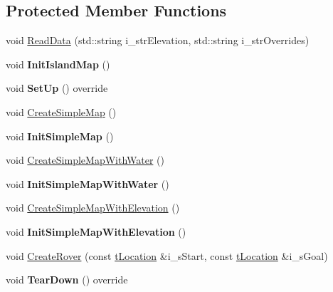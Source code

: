 \subsection*{Protected Member Functions}
\begin{DoxyCompactItemize}
\item 
void \mbox{\hyperlink{classc_planner_test_af8a0f625c6cb4dffc1ea3182332e53c6}{Read\+Data}} (std\+::string i\+\_\+str\+Elevation, std\+::string i\+\_\+str\+Overrides)
\item 
\mbox{\label{classc_planner_test_ac1aac6152ea3ac86c5205fd8f0835d0c}} 
void {\bfseries Init\+Island\+Map} ()
\item 
\mbox{\label{classc_planner_test_a88ad8b0e63c66a9d94c7606aa67ef20d}} 
void {\bfseries Set\+Up} () override
\item 
void \mbox{\hyperlink{classc_planner_test_a448aac45bdd26a18050613619d9f33e4}{Create\+Simple\+Map}} ()
\item 
\mbox{\label{classc_planner_test_a35a934fb8c86a7c661c94ffeb4dd7a52}} 
void {\bfseries Init\+Simple\+Map} ()
\item 
void \mbox{\hyperlink{classc_planner_test_a1e8b184185494cae8444fb7d5f846334}{Create\+Simple\+Map\+With\+Water}} ()
\item 
\mbox{\label{classc_planner_test_aa55c78961deacf34543933e12cd82000}} 
void {\bfseries Init\+Simple\+Map\+With\+Water} ()
\item 
void \mbox{\hyperlink{classc_planner_test_a3d08d274ae12fbecd664ec70b4d6dfa3}{Create\+Simple\+Map\+With\+Elevation}} ()
\item 
\mbox{\label{classc_planner_test_a59339eef13103205b18ab2f1b1f59d7e}} 
void {\bfseries Init\+Simple\+Map\+With\+Elevation} ()
\item 
void \mbox{\hyperlink{classc_planner_test_adc6dedb45d227191f0c87843a182d802}{Create\+Rover}} (const \mbox{\hyperlink{structplanner_1_1t_location}{t\+Location}} \&i\+\_\+s\+Start, const \mbox{\hyperlink{structplanner_1_1t_location}{t\+Location}} \&i\+\_\+s\+Goal)
\item 
\mbox{\label{classc_planner_test_ae7db6ebf867e3ba6bf8adaaca636f064}} 
void {\bfseries Tear\+Down} () override
\end{DoxyCompactItemize}
